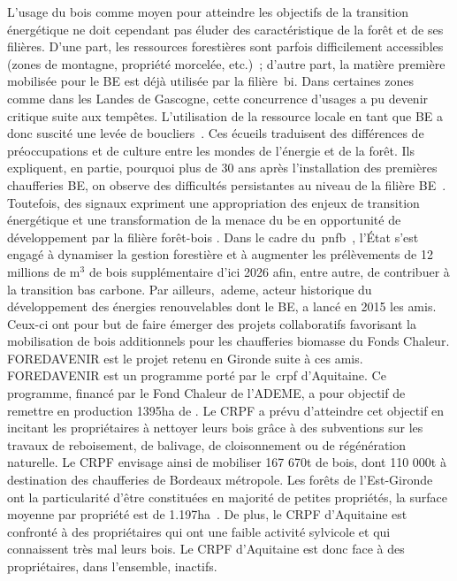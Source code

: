 \documentclass[12pt]{report}
\newcommand\indexp[1]{#1\index{#1}}
\begin{document}
L'usage du bois comme moyen pour atteindre les objectifs de la transition
énergétique ne doit cependant pas éluder des caractéristique de la forêt et de
ses filières. D'une part, les ressources forestières sont parfois difficilement
accessibles (zones de montagne, propriété morcelée, etc.)~; d'autre part, la
matière première mobilisée pour le BE est déjà utilisée par la filière~\gls{bi}.
Dans certaines zones comme dans les Landes de Gascogne, cette concurrence d'usages
a pu devenir critique suite aux tempêtes. L'utilisation de la ressource
locale en tant que BE a donc suscité une levée de boucliers~\citep{alexandre2012_ref124,ecofor2010_ref125}. Ces écueils
traduisent des différences de préoccupations et de culture entre les mondes de
l'énergie et de la forêt. Ils expliquent, en partie, pourquoi plus de 30 ans
après l'installation des premières chaufferies BE, on observe des difficultés
persistantes au niveau de la filière BE~\citep{tabourdeau2014_ref117,BEbanosDehez_ref78}.
Toutefois, des signaux expriment une appropriation des enjeux de transition
énergétique et une transformation de la menace du \gls{be} en opportunité de
développement par la filière forêt-bois \citep{sergent2014_ref110}.
Dans le cadre du~\gls{pnfb}~\citep{pnfb_ref98}, l'État s'est engagé
à dynamiser la gestion forestière et à augmenter les prélèvements de 12 millions de
m$^{3}$ de bois supplémentaire d'ici 2026 afin, entre autre, de contribuer à la
transition bas carbone. Par ailleurs,~\gls{ademe}, acteur historique
du développement des énergies renouvelables dont le BE, a lancé en 2015 les
\glspl{ami}. Ceux-ci ont pour
but de faire émerger des projets collaboratifs favorisant la mobilisation de
bois additionnels pour les chaufferies biomasse du Fonds Chaleur. FOREDAVENIR
est le projet retenu en Gironde suite à ces \glspl{ami}.\\

\indexp{FOREDAVENIR} est un programme porté par le~\gls{crpf}
d'Aquitaine. Ce programme, financé par le Fond Chaleur de l'ADEME, a pour
objectif de remettre en production 1395ha de . Le CRPF a prévu d'atteindre cet objectif en incitant
les propriétaires à nettoyer leurs bois grâce à des subventions sur les travaux
de reboisement, de balivage, de cloisonnement ou de régénération naturelle. Le
CRPF envisage ainsi de mobiliser 167 670t de bois, dont 110 000t à destination
des chaufferies de Bordeaux métropole. Les forêts de l'Est-Gironde
ont la particularité d'être constituées en majorité de petites propriétés,
la surface moyenne par propriété est de 1.197ha~\citep{diagForedavenir_ref71}.
De plus, le CRPF d'Aquitaine est confronté à des
propriétaires qui ont une faible activité sylvicole et qui connaissent
très mal leurs bois. Le CRPF d'Aquitaine est donc face à des propriétaires,
dans l'ensemble, inactifs.\\
\end{document}
